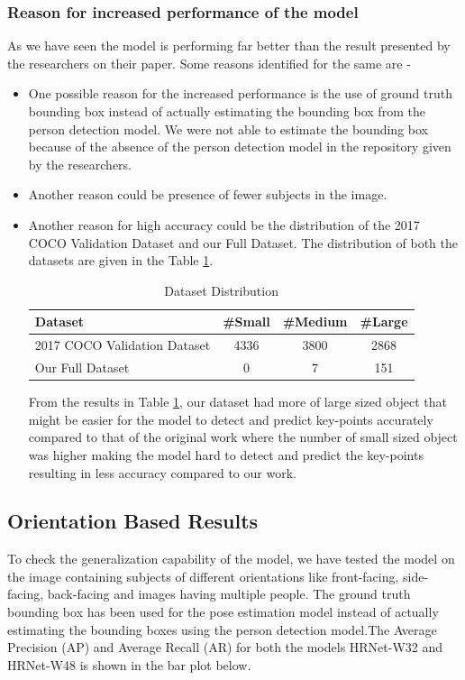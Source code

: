 \documentclass[a4paper,12pt]{article}
\begin{document}
\subsubsection{Reason for increased performance of the model }
As we have seen the model is performing far better than the result presented by the researchers on their paper. Some reasons identified for the same are - 
\begin{itemize}
    \item One possible reason for the increased performance is the use of ground truth bounding box instead of actually estimating the bounding box from the person detection model. We were not able to estimate the bounding box because of the absence of the person detection model in the repository given by the researchers.
    
    \item Another reason could be presence of fewer subjects in the image. 
    
    \item Another reason for high accuracy could be the distribution of the 2017 COCO Validation Dataset and our Full Dataset. The distribution of both the datasets are given in the Table \ref{tab:dist}.
    
    \begin{table}[h]
    \begin{center}
    \begin{tabular}{ l | c | c | c }
    Dataset & \#Small & \#Medium & \#Large \\
    \hline \hline
    2017 COCO Validation Dataset & 4336 & 3800 & 2868 \\
    Our Full Dataset & 0 & 7 & 151 \\
    \end{tabular}
    \caption{Dataset Distribution}
    \label{tab:dist}
    \end{center}
    \end{table}
    
    From the results in Table \ref{tab:dist}, our dataset had more of large sized object that might be easier for the model to detect and predict key-points accurately compared to that of the original work where the number of small sized object was higher making the model hard to detect and predict the key-points resulting in less accuracy compared to our work.

\end{itemize}


\subsection{Orientation Based Results}
To check the generalization capability of the model, we have tested the model on the image containing subjects of different orientations like front-facing, side-facing, back-facing and images having multiple people. The ground truth bounding box has been used for the pose estimation model instead of actually estimating the bounding boxes using the person detection model.The Average Precision (AP) and Average Recall (AR) for both the models HRNet-W32 and HRNet-W48 is shown in the bar plot below.
\end{document}
